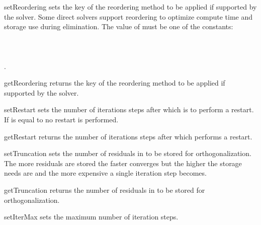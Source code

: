 \begin{methoddesc}[SolverOptions]{setReordering}{}
sets the key of the reordering method to be applied if supported by the solver.
Some direct solvers support reordering to optimize compute time and storage
use during elimination. The value of  must be one of the
constants:\\
 \\
 \\
 \\
 .
\end{methoddesc}

\begin{methoddesc}[SolverOptions]{getReordering}{}
returns the key of the reordering method to be applied if supported by the solver.
\end{methoddesc}

\begin{methoddesc}[SolverOptions]{setRestart}{}
sets the number of iterations steps after which \GMRES is to perform a restart.
If  is equal to  no restart is performed.
\end{methoddesc}

\begin{methoddesc}[SolverOptions]{getRestart}{}
returns the number of iterations steps after which \GMRES performs a restart.
\end{methoddesc}

\begin{methoddesc}[SolverOptions]{setTruncation}{}
sets the number of residuals in \GMRES to be stored for orthogonalization. 
The more residuals are stored the faster \GMRES converges but the higher the storage needs are and the more expensive
a single iteration step becomes.
\end{methoddesc}

\begin{methoddesc}[SolverOptions]{getTruncation}{}
returns the number of residuals in \GMRES to be stored for orthogonalization.
\end{methoddesc}


\begin{methoddesc}[SolverOptions]{setIterMax}{}
sets the maximum number of iteration steps.
\end{methoddesc}

